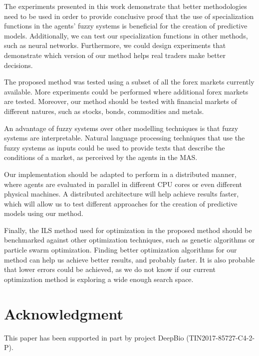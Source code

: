 \documentclass{ieeeaccess}
\begin{document}
The experiments presented in this work demonstrate that better
methodologies need to be used in order to provide conclusive proof
that the use of specialization functions in the agents' fuzzy systems is
beneficial for the creation of predictive models. Additionally, we can
test our specialization functions in other methods, such as neural
networks. Furthermore, we could design experiments that demonstrate
which version of our method helps real traders make better decisions.

The proposed method was tested using a subset of all the forex markets
currently available. More experiments could be performed where
additional forex markets are tested. Moreover, our method should be
tested with financial markets of different natures, such as stocks,
bonds, commodities and metals.

An advantage of fuzzy systems over other modelling techniques is that
fuzzy systems are interpretable. Natural language processing
techniques that use the fuzzy systems as inputs could be used to
provide texts that describe the conditions of a market, as perceived
by the agents in the MAS.

Our implementation should be adapted to perform in a distributed
manner, where agents are evaluated in parallel in different CPU cores
or even different physical machines. A distributed architecture will
help achieve results faster, which will allow us to test different
approaches for the creation of predictive models using our method.

Finally, the ILS method used for optimization in the proposed method should be
benchmarked against other optimization techniques, such as genetic
algorithms or particle swarm optimization. Finding better optimization
algorithms for our method can help us achieve better results, and probably faster. It is
also probable that lower errors could be achieved, as we do not know
if our current optimization method is exploring a wide enough search space.

\section*{Acknowledgment}
This paper has been supported in part by project DeepBio (TIN2017-85727-C4-2-P).
\end{document}
